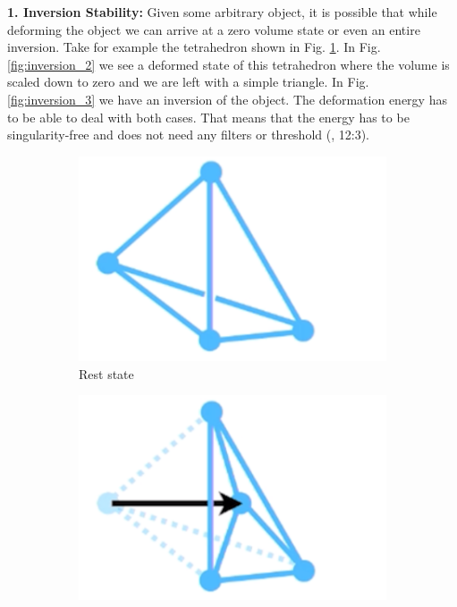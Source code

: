 \textbf{1. Inversion Stability:} Given some arbitrary object, it is possible that while deforming the object we can arrive at a zero volume state or even an entire inversion. Take for example the tetrahedron shown in Fig. \ref{fig:inversion_1}. In Fig. \ref{fig:inversion_2} we see a deformed state of this tetrahedron where the volume is scaled down to zero and we are left with a simple triangle. In Fig. \ref{fig:inversion_3} we have an inversion of the object. The deformation energy has to be able to deal with both cases. That means that the energy has to be singularity-free and does not need any filters or threshold (\cite{Smith:2018:SNF:3191713.3180491}, 12:3).


\begin{figure}[!ht]
\centering
\begin{subfigure}{.3\textwidth}
  \centering
  \includegraphics[width=.8\linewidth]{resources/inversion_1}  
  \caption{Rest state}
  \label{fig:inversion_1}
\end{subfigure}
\begin{subfigure}{.3\textwidth}
  \centering
  \includegraphics[width=.8\linewidth]{resources/inversion_2}  

\end{subfigure}
\end{figure}
